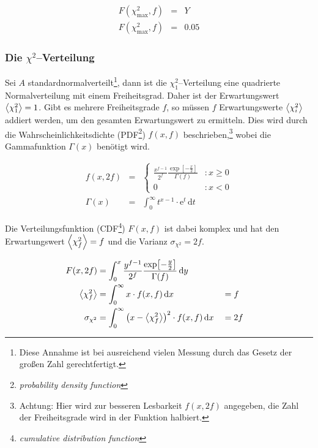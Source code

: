 \documentclass[12pt,a4paper]{scrartcl}
\numberwithin{equation}{section} %
\begin{document}
\begin{eqnarray}
    F(\chi^2_\mathrm{max}, f) &=& Y \\
    F(\chi^2_\mathrm{max}, f) &=& 0.05 \label{eq:ChiMaxPearson}
\end{eqnarray}

\hypertarget{die-chi2verteilung}{%
\subsubsection{Die $\chi^2$--Verteilung}\label{die-chi2verteilung}}

Sei $A$ standardnormalverteilt\footnote{Diese Annahme ist bei ausreichend vielen Messung durch das Gesetz der großen Zahl gerechtfertigt.}, dann ist die $\chi_1^2$--Verteilung eine quadrierte Normalverteilung mit einem Freiheitsgrad. Daher ist der Erwartungswert $\expval{\chi_1^2}=1$. Gibt es mehrere Freiheitsgrade $f$, so müssen $f$ Erwartungswerte $\expval{\chi_i^2}$ addiert werden, um den gesamten Erwartungswert zu ermitteln. Dies wird durch die Wahrscheinlichkeitsdichte (PDF\footnote{\emph{probability density function}}) $f(x, f)$ beschrieben,\footnote{Achtung: Hier wird zur besseren Lesbarkeit $f(x, 2f)$ angegeben, die Zahl der Freiheitsgrade wird in der Funktion halbiert.} wobei die Gammafunktion $\Gamma(x)$ benötigt wird.

\begin{eqnarray}
    f(x, 2f) &=&
        \begin{cases}
                \frac{x^{f-1}}{2^f}
                    \frac{\exp[-\frac{x}{2}]}{\Gamma(f)}
                    & : x\ge 0 \\
                0 & : x < 0
        \end{cases} \\
    \Gamma(x) &=& \int_0^\infty t^{x-1}\cdot \mathrm e^t \,\mathrm dt
\end{eqnarray}

\noindent
Die Verteilungsfunktion (CDF\footnote{\emph{cumulative distribution function}}) $F(x, f)$ ist dabei komplex und hat den Erwartungswert $\expval{\chi_f^2}=f$ und die Varianz $\sigma_{\chi^2}=2f$.

\begin{align}
    F(x, 2f) &=
        \int_0^x
            \frac{y^{f-1}}{2^f}
                \frac{\exp[-\frac{y}{2}]}{\Gamma(f)}
            \,\mathrm dy \\
    \expval{\chi_f^2} &=
        \int_0^\infty x\cdot f(x, f)
            \,\mathrm dx
        &&= f \\
    \sigma_{\chi^2} &=
        \int_0^\infty \left(x - \expval{\chi_f^2}\right)^2 \cdot f(x, f)
            \,\mathrm dx
         &&=2f
\end{align}
\end{document}
